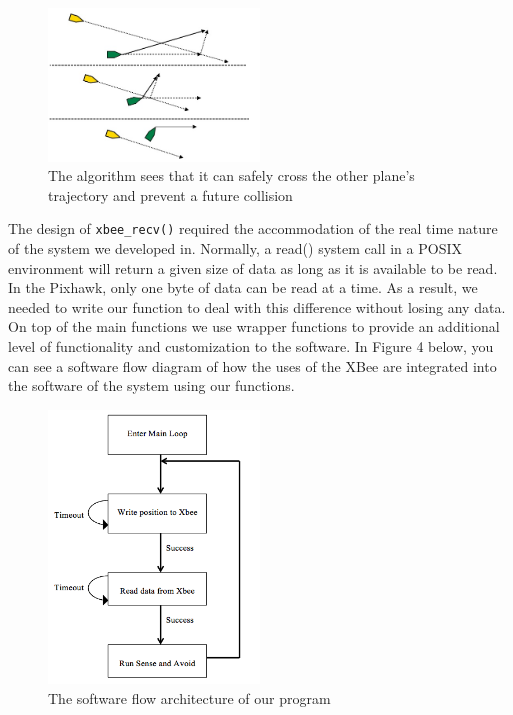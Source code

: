 \documentclass[12pt]{article}
\begin{document}
\begin{figure}[ht!]
   \centering
   \includegraphics[width=0.5\textwidth]{drift.png}
   \caption{The algorithm sees that it can safely cross the other plane's trajectory and prevent a future collision}
\end{figure}

The design of \texttt{xbee\_recv()} required the accommodation of the real time nature of the system we developed in. Normally, a read() system call in a POSIX environment will return a given size of data as long as it is available to be read. In the Pixhawk, only one byte of data can be read at a time. As a result, we needed to write our function to deal with this difference without losing any data. On top of the main functions we use wrapper functions to provide an additional level of functionality and customization to the software. In Figure 4 below, you can see a software flow diagram of how the uses of the XBee are integrated into the software of the system using our functions.

\begin{figure}[ht!]
   \centering
   \includegraphics[width=0.5\textwidth]{flow.png}
   \caption{The software flow architecture of our program}
\end{figure}
\end{document}
